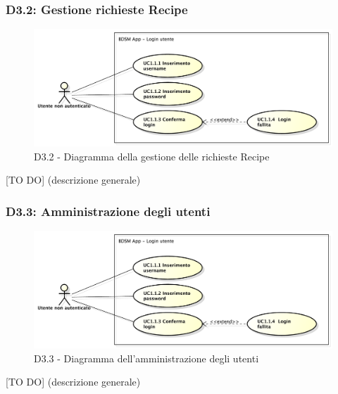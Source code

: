 		\subsubsection{D3.2: Gestione richieste Recipe} %
		\label{ssub:gestione_richieste_recipe}
		\begin{figure}[!htbp]
			\centering
			\centerline{\includegraphics[scale=0.45]{./images/UC1_1.pdf}}
			\caption{D3.2 - Diagramma della gestione delle richieste Recipe}
		\end{figure}
		[TO DO] (descrizione generale)

		\subsubsection{D3.3: Amministrazione degli utenti} %
		\label{ssub:amministrazione_degli_utenti}
		\begin{figure}[!htbp]
			\centering
			\centerline{\includegraphics[scale=0.45]{./images/UC1_1.pdf}}
			\caption{D3.3 - Diagramma dell'amministrazione degli utenti}
		\end{figure}
		[TO DO] (descrizione generale)








